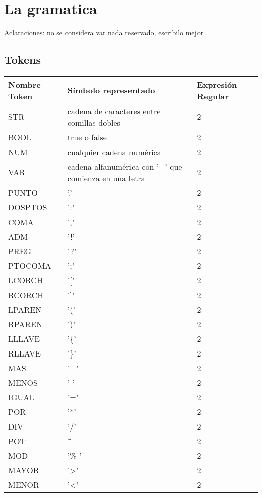 \section{La gramatica}

Aclaraciones: no se considera var nada reservado, escribilo mejor

\subsection{Tokens}

\begin{table}[!htb]
\begin{center}
\begin{tabular}{| l | l | l |}
\hline
Nombre Token & Símbolo representado & Expresión Regular\\
\hline
STR 	& cadena de caracteres entre comillas dobles & 2 \\
\hline
BOOL & true o false & 2 \\
\hline
NUM 	& cualquier cadena numérica & 2 \\
\hline
VAR 	& cadena alfanumérica con '_' que comienza en una letra & 2 \\
\hline
PUNTO & '.' & 2 \\
\hline
DOSPTOS	& ':' & 2 \\
\hline
COMA & ',' & 2 \\
\hline
ADM & '!' & 2 \\
\hline
PREG & '?' & 2 \\
\hline
PTOCOMA 	& ';' & 2 \\
\hline
LCORCH & '[' & 2 \\
\hline
RCORCH & ']' & 2 \\
\hline
LPAREN & '(' & 2 \\
\hline
RPAREN & ')' & 2 \\
\hline
LLLAVE & '\{' & 2 \\
\hline
RLLAVE& '\}' & 2 \\
\hline
MAS & '+' & 2 \\
\hline
MENOS & '-' & 2 \\
\hline
IGUAL & '=' & 2 \\
\hline
POR & '*' & 2 \\
\hline
DIV & '/' & 2 \\
\hline
POT & '\^' & 2 \\
\hline
MOD & '\% ' & 2 \\
\hline
MAYOR & '>' & 2 \\
\hline
MENOR & '<' & 2 \\

\end{tabular}
\end{center}
\end{table}

